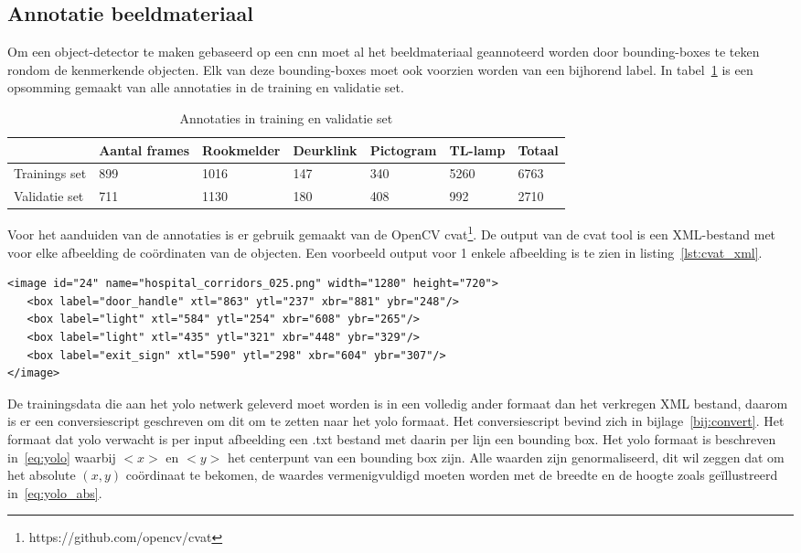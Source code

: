 \subsection{Annotatie beeldmateriaal}
Om een object-detector te maken gebaseerd op een \gls{cnn} moet al het beeldmateriaal geannoteerd worden door bounding-boxes te teken rondom de kenmerkende objecten.
Elk van deze bounding-boxes moet ook voorzien worden van een bijhorend label. In tabel~\ref{tab:annotaties} is een opsomming gemaakt van alle annotaties in de training en validatie set.

\begin{table}[h]
    \caption{Annotaties in training en validatie set}\label{tab:annotaties}
    \begin{tabular}{l | l | l | l | l | l | l}
        & Aantal frames & Rookmelder & Deurklink & Pictogram & TL-lamp & Totaal \\ \hline
        Trainings set & 899 & 1016 & 147 & 340 & 5260 & 6763 \\
        Validatie set & 711 & 1130 & 180 & 408 & 992 & 2710 \\
    \end{tabular}
\end{table}

Voor het aanduiden van de annotaties is er gebruik gemaakt van de OpenCV \gls{cvat}\footnote{https://github.com/opencv/cvat}.
De output van de \gls{cvat} tool is een XML-bestand met voor elke afbeelding de co\"{o}rdinaten van de objecten. Een voorbeeld output voor 1 enkele afbeelding is te zien in listing~\ref{lst:cvat_xml}.

   \begin{lstlisting}[basicstyle=\small]
<image id="24" name="hospital_corridors_025.png" width="1280" height="720">
   <box label="door_handle" xtl="863" ytl="237" xbr="881" ybr="248"/>
   <box label="light" xtl="584" ytl="254" xbr="608" ybr="265"/>
   <box label="light" xtl="435" ytl="321" xbr="448" ybr="329"/>
   <box label="exit_sign" xtl="590" ytl="298" xbr="604" ybr="307"/>
</image>
   \end{lstlisting}

De trainingsdata die aan het \gls{yolo} netwerk geleverd moet worden is in een volledig ander formaat dan het verkregen XML bestand, daarom is er een conversiescript geschreven om dit om te zetten naar het \gls{yolo} formaat.
Het conversiescript bevind zich in bijlage~\ref{bij:convert}.
Het formaat dat \gls{yolo} verwacht is per input afbeelding een .txt bestand met daarin per lijn een bounding box. Het \gls{yolo} formaat is beschreven in~\ref{eq:yolo} waarbij $<x>$ en $<y>$ het centerpunt van een bounding box zijn.
Alle waarden zijn genormaliseerd, dit wil zeggen dat om het absolute $(x, y)$ co\"{o}rdinaat te bekomen, de waardes vermenigvuldigd moeten worden met de breedte en de hoogte zoals ge\"{i}llustreerd in~\ref{eq:yolo_abs}.


